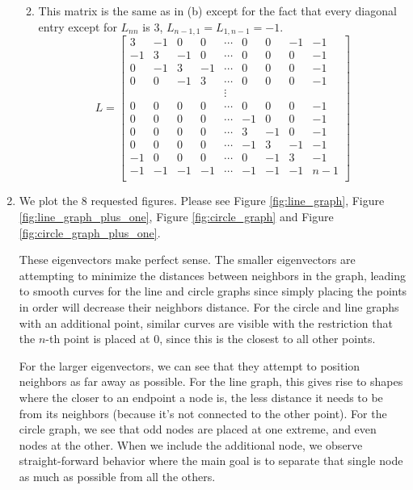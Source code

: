 \documentclass[12pt]{article}
\begin{document}
\begin{enumerate}[label=(\alph*)]
\begin{enumerate}[label=(\alph*)]
\[        \]
      \item
        This matrix is the same as in (b) except for the fact that every diagonal entry except for $L_{nn}$ is $3$, $L_{n-1,1} = L_{1, n-1} = -1$.
        \[
          L = \begin{bmatrix}
            3 & -1 & 0 & 0 & \cdots & 0 & 0 & -1 & -1 \\
            -1 & 3 & -1 & 0 & \cdots & 0 & 0 & 0 & -1 \\
            0 & -1 & 3 & -1 & \cdots & 0 & 0 & 0 & -1 \\
            0 & 0 & -1 & 3 & \cdots & 0 & 0 & 0 & -1 \\
              &   &   &   & \vdots &   &   &   &   \\
            0 & 0 & 0 & 0 & \cdots & 0 & 0 & 0 & -1  \\
            0 & 0 & 0 & 0 & \cdots & -1 & 0 & 0 & -1  \\
            0 & 0 & 0 & 0 & \cdots & 3 & -1 & 0 & -1  \\
            0 & 0 & 0 & 0 & \cdots & -1 & 3 & -1 & -1  \\
            -1 & 0 & 0 & 0 & \cdots & 0 & -1 & 3 & -1  \\
            -1 & -1 & -1 & -1 & \cdots & -1 & -1 & -1 & n-1  \\
          \end{bmatrix}
        \]
    \end{enumerate}
  \item
    We plot the 8 requested figures. Please see Figure \ref{fig:line_graph}, Figure \ref{fig:line_graph_plus_one}, Figure \ref{fig:circle_graph} and Figure \ref{fig:circle_graph_plus_one}.

    These eigenvectors make perfect sense. The smaller eigenvectors are attempting to minimize the distances between neighbors in the graph, leading to smooth curves for the line and circle graphs since simply placing the points in order will decrease their neighbors distance. For the circle and line graphs with an additional point, similar curves are visible with the restriction that the $n$-th point is placed at $0$, since this is the closest to all other points.

    For the larger eigenvectors, we can see that they attempt to position neighbors as far away as possible. For the line graph, this gives rise to shapes where the closer to an endpoint a node is, the less distance it needs to be from its neighbors (because it's not connected to the other point). For the circle graph, we see that odd nodes are placed at one extreme, and even nodes at the other. When we include the additional node, we observe straight-forward behavior where the main goal is to separate that single node as much as possible from all the others.



\end{enumerate}
\end{document}
